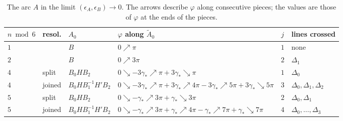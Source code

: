 \begin{table}[ht]
\centering\small
\begin{tabular}{lllp{5.6cm}cl}
\toprule
$n\bmod6$ & resol. & $A_0$ & $\varphi$ along $\tilde A_0$ & $j$ & lines crossed\\
\midrule
$1$ & & $B$ & $0\nearrow\pi$ & $1$ & none\\
$2$ & & $B$ & $0\nearrow3\pi$ & $2$ & $\Delta_1$\\
$4$ & split & $B_0HB_2$ & $0\searrow-3\gamma_*\nearrow\pi+3\gamma_*\searrow\pi$ & $1$ & $\Delta_0$\\
$4$ & joined & $B_0HB_1^{-1}H'B_2$ & $0\searrow-3\gamma_*\nearrow\pi+3\gamma_*\nearrow4\pi-3\gamma_*\nearrow5\pi+3\gamma_*\searrow5\pi$ & $3$ &
$\Delta_0,\Delta_1,\Delta_2$\\
$5$ & split & $B_0HB_2$ & $0\searrow-\gamma_*\nearrow3\pi+\gamma_*\searrow3\pi$ & $2$ & $\Delta_0,\Delta_1$\\
$5$ & joined & $B_0HB_1^{-1}H'B_2$ & $0\searrow-\gamma_*\nearrow3\pi+\gamma_*\nearrow4\pi-\gamma_*\nearrow7\pi+\gamma_*\searrow7\pi$ & $4$ &
$\Delta_0,\dots,\Delta_3$\\
\bottomrule
\end{tabular}
\medskip
\caption{The arc $A$ in the limit $(\epsilon_A,\epsilon_B)\to0$. The arrows describe $\varphi$ along consecutive pieces; the values
are those of $\varphi$ at the ends of the pieces.}
\label{tab:arcpieces}
\end{table}

